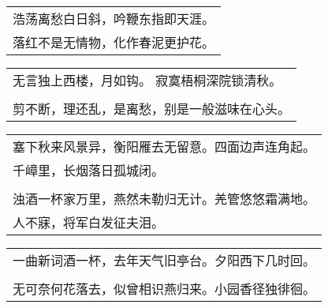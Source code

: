 \noindent\begin{minipage}{\linewidth}
  \vskip-3pt\begin{table}[H]
    \centering
    \begin{tabular}{@{}l@{}}
浩荡离愁白日斜，吟鞭东指即天涯。\\
落红不是无情物，化作春泥更护花。
    \end{tabular}
  \end{table}
\end{minipage}
\vspace{1cm}


\noindent\begin{minipage}{\linewidth}
  \vskip-3pt\begin{table}[H]
    \centering
    \begin{tabular}{@{}l@{}}
无言独上西楼，月如钩。 寂寞梧桐深院锁清秋。\\
\\
剪不断，理还乱，是离愁，别是一般滋味在心头。
    \end{tabular}
  \end{table}
\end{minipage}
\vspace{1cm}


\noindent\begin{minipage}{\linewidth}
  \vskip-3pt\begin{table}[H]
    \centering
    \begin{tabular}{@{}l@{}}
塞下秋来风景异，衡阳雁去无留意。四面边声连角起。\\
千嶂里，长烟落日孤城闭。\\
\\
浊酒一杯家万里，燕然未勒归无计。羌管悠悠霜满地。\\
人不寐，将军白发征夫泪。
    \end{tabular}
  \end{table}
\end{minipage}
\vspace{1cm}


\noindent\begin{minipage}{\linewidth}
  \vskip-3pt\begin{table}[H]
    \centering
    \begin{tabular}{@{}l@{}}
一曲新词酒一杯，去年天气旧亭台。夕阳西下几时回。\\
\\
无可奈何花落去，似曾相识燕归来。小园香径独徘徊。
    \end{tabular}
  \end{table}
\end{minipage}
\vspace{1cm}


